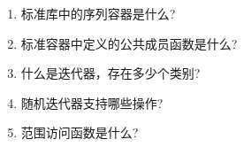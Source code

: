 \begin{enumerate}
\item
标准库中的序列容器是什么?

\item
标准容器中定义的公共成员函数是什么?

\item
什么是迭代器，存在多少个类别?

\item
随机迭代器支持哪些操作?

\item
范围访问函数是什么?
\end{enumerate}
